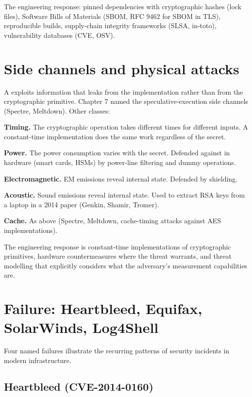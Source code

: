 The engineering response: pinned dependencies with cryptographic hashes (lock files), Software Bills of Materials (SBOM, RFC 9462 for SBOM in TLS), reproducible builds, supply-chain integrity frameworks (SLSA, in-toto), vulnerability databases (CVE, OSV).

\section{Side channels and physical attacks}

A  exploits information that leaks from the implementation rather than from the cryptographic primitive. Chapter 7 named the speculative-execution side channels (Spectre, Meltdown). Other classes:

\textbf{Timing.} The cryptographic operation takes different times for different inputs. A constant-time implementation does the same work regardless of the secret.

\textbf{Power.} The power consumption varies with the secret. Defended against in hardware (smart cards, HSMs) by power-line filtering and dummy operations.

\textbf{Electromagnetic.} EM emissions reveal internal state. Defended by shielding.

\textbf{Acoustic.} Sound emissions reveal internal state. Used to extract RSA keys from a laptop in a 2014 paper (Genkin, Shamir, Tromer).

\textbf{Cache.} As above (Spectre, Meltdown, cache-timing attacks against AES implementations).

The engineering response is constant-time implementations of cryptographic primitives, hardware countermeasures where the threat warrants, and threat modelling that explicitly considers what the adversary's measurement capabilities are.

\section{Failure: Heartbleed, Equifax, SolarWinds, Log4Shell}

Four named failures illustrate the recurring patterns of security incidents in modern infrastructure.

\subsection{Heartbleed (CVE-2014-0160)}

